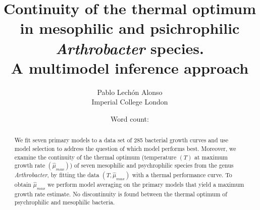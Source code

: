 \documentclass[titlepage,11pt]{article}
\newcommand{\wordcount}{} %
\begin{document}
	
	\title{\textbf{Continuity of the thermal optimum in mesophilic and psichrophilic \textit{Arthrobacter} species.\\
			A multimodel inference approach} }
	\author{Pablo Lechón Alonso \\ [30pt]
		Imperial College London}
	\date{Word count: \wordcount}%
	\maketitle
	
	
	\begin{abstract}
		We fit seven primary models to a data set of 285 bacterial growth curves and use model selection to address the question of which model performs best. Moreover, we examine the continuity of the thermal optimum (temperature $ (T) $ at maximum growth rate $ (\hat{\mu}_{max} )$) of seven mesophilic and psychrophilic species from the genus \textit{Arthrobacter}, by fitting the data $ (T, \hat{\mu}_{max}) $ with a thermal performance curve. To obtain $\hat{\mu}_{max}$ we perform model averaging on the primary models that yield a maximum growth rate estimate. No discontinuity is found between the thermal optimum of psychrophilic and mesophilic bacteria. 
	\end{abstract}
	
	\tableofcontents
	\newpage
	
\end{document}
